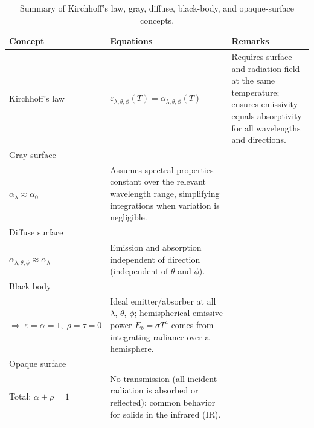 \begin{table}[H]
\centering
\caption{Summary of Kirchhoff’s law, gray, diffuse, black-body, and opaque-surface concepts.}
\footnotesize
\setlength{\tabcolsep}{6pt}
\begin{tabularx}{\linewidth}{@{}p{2.5cm} p{4cm} X@{}}
\toprule
\textbf{Concept}     & \textbf{Equations}                                                                                         & \textbf{Remarks}                                                                                     \\
\midrule
Kirchhoff’s law      
  & $\displaystyle \varepsilon_{\lambda,\theta,\phi}(T)
                  =\alpha_{\lambda,\theta,\phi}(T)$
  & Requires surface and radiation field at the same temperature; ensures emissivity equals absorptivity for all wavelengths and directions. \\

\addlinespace
Gray surface         
  & \makecell[l]{$\displaystyle \varepsilon_{\lambda}\approx \varepsilon_0$\\[0.3em]
                 $\displaystyle \alpha_{\lambda} \approx \alpha_0$}
  & Assumes spectral properties constant over the relevant wavelength range, simplifying integrations when variation is negligible. \\

\addlinespace
Diffuse surface      
  & \makecell[l]{$\displaystyle \varepsilon_{\lambda,\theta,\phi}\approx\varepsilon_{\lambda}$\\[0.3em]
                 $\displaystyle \alpha_{\lambda,\theta,\phi}\approx\alpha_{\lambda}$}
  & Emission and absorption independent of direction (independent of $\theta$ and $\phi$). \\

\addlinespace
Black body           
  & \makecell[l]{$\displaystyle \varepsilon_{\lambda} = \alpha_{\lambda}=1$\\[0.3em]
                 $\displaystyle \Rightarrow\;\varepsilon=\alpha=1,\;\rho=\tau=0$}
  & Ideal emitter/absorber at all $\lambda$, $\theta$, $\phi$; hemispherical emissive power $E_b=\sigma T^4$ comes from integrating radiance over a hemisphere. \\

\addlinespace
Opaque surface       
  & \makecell[l]{$\displaystyle \tau_{\lambda}=0\;\Rightarrow\;\alpha_{\lambda}+\rho_{\lambda}=1$\\[0.3em]
                 Total: $\alpha+\rho=1$}
  & No transmission (all incident radiation is absorbed or reflected); common behavior for solids in the infrared (IR). \\
\bottomrule
\end{tabularx}

\end{table}

